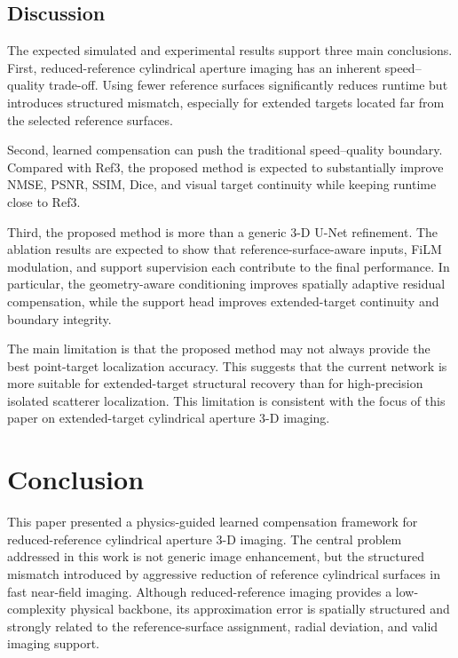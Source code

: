 \documentclass[journal]{IEEEtran}
\begin{document}
\subsection{Discussion}
\label{subsec:results_discussion}

The expected simulated and experimental results support three main conclusions. First, reduced-reference cylindrical aperture imaging has an inherent speed--quality trade-off. Using fewer reference surfaces significantly reduces runtime but introduces structured mismatch, especially for extended targets located far from the selected reference surfaces.

Second, learned compensation can push the traditional speed--quality boundary. Compared with Ref3, the proposed method is expected to substantially improve NMSE, PSNR, SSIM, Dice, and visual target continuity while keeping runtime close to Ref3.

Third, the proposed method is more than a generic 3-D U-Net refinement. The ablation results are expected to show that reference-surface-aware inputs, FiLM modulation, and support supervision each contribute to the final performance. In particular, the geometry-aware conditioning improves spatially adaptive residual compensation, while the support head improves extended-target continuity and boundary integrity.

The main limitation is that the proposed method may not always provide the best point-target localization accuracy. This suggests that the current network is more suitable for extended-target structural recovery than for high-precision isolated scatterer localization. This limitation is consistent with the focus of this paper on extended-target cylindrical aperture 3-D imaging.

\section{Conclusion}
\label{sec:conclusion}

This paper presented a physics-guided learned compensation framework for reduced-reference cylindrical aperture 3-D imaging. The central problem addressed in this work is not generic image enhancement, but the structured mismatch introduced by aggressive reduction of reference cylindrical surfaces in fast near-field imaging. Although reduced-reference imaging provides a low-complexity physical backbone, its approximation error is spatially structured and strongly related to the reference-surface assignment, radial deviation, and valid imaging support.
\end{document}
